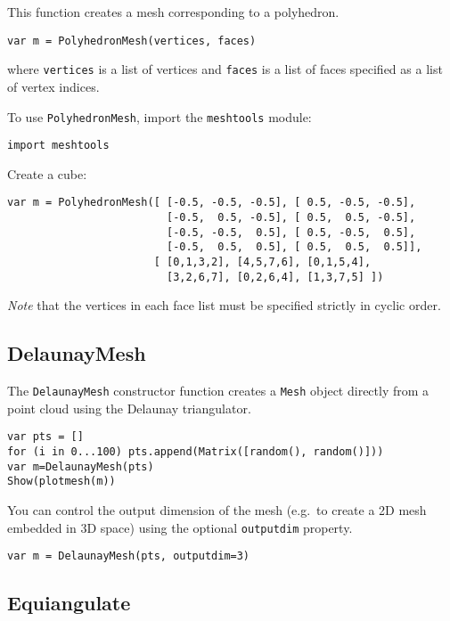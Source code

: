 This function creates a mesh corresponding to a polyhedron.

\begin{lstlisting}
var m = PolyhedronMesh(vertices, faces)
\end{lstlisting}

where \texttt{vertices} is a list of vertices and \texttt{faces} is a
list of faces specified as a list of vertex indices.

To use \texttt{PolyhedronMesh}, import the \texttt{meshtools} module:

\begin{lstlisting}
import meshtools
\end{lstlisting}

Create a cube:

\begin{lstlisting}
var m = PolyhedronMesh([ [-0.5, -0.5, -0.5], [ 0.5, -0.5, -0.5],
                         [-0.5,  0.5, -0.5], [ 0.5,  0.5, -0.5],
                         [-0.5, -0.5,  0.5], [ 0.5, -0.5,  0.5],
                         [-0.5,  0.5,  0.5], [ 0.5,  0.5,  0.5]],
                       [ [0,1,3,2], [4,5,7,6], [0,1,5,4], 
                         [3,2,6,7], [0,2,6,4], [1,3,7,5] ])
\end{lstlisting}

\emph{Note} that the vertices in each face list must be specified
strictly in cyclic order.

\hypertarget{delaunaymesh}{%
\subsection{DelaunayMesh}\label{delaunaymesh}}

The \texttt{DelaunayMesh} constructor function creates a \texttt{Mesh}
object directly from a point cloud using the Delaunay triangulator.

\begin{lstlisting}
var pts = []
for (i in 0...100) pts.append(Matrix([random(), random()]))
var m=DelaunayMesh(pts)
Show(plotmesh(m))
\end{lstlisting}

You can control the output dimension of the mesh (e.g.~to create a 2D
mesh embedded in 3D space) using the optional \texttt{outputdim}
property.

\begin{lstlisting}
var m = DelaunayMesh(pts, outputdim=3)
\end{lstlisting}

\hypertarget{equiangulate}{%
\subsection{Equiangulate}\label{equiangulate}}

